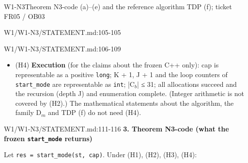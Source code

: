 \begin{card}{W1-N3}{Theorem N3-code (a)–(e) and the reference algorithm TDP (f); ticket FR05 / OB03}
\begin{stmt}{W1/W1-N3/STATEMENT.md:105-105}
\begin{itemize}
\end{itemize}
\end{stmt}
\begin{stmt}{W1/W1-N3/STATEMENT.md:106-109}
\begin{itemize}
\item (H4) \textbf{Execution} (for the claims about the frozen C++ only): cap is representable as a positive \texttt{long}; K + 1,
J + 1 and the loop counters of \texttt{start\_mode} are representable as \texttt{int}; |C$_{b}$| ≤ 31; all allocations succeed and the
recursion (depth J) and enumeration complete. (Integer arithmetic is not covered by (H2).) The mathematical
statements about the algorithm, the family D$_{m}$ and TDP (f) do not need (H4).
\end{itemize}
\end{stmt}
\begin{stmt}{W1/W1-N3/STATEMENT.md:111-116}
\textbf{3. Theorem N3-code (what the frozen \texttt{start\_mode} returns)}

Let \texttt{res = start\_mode(st, cap)}. Under (H1), (H2), (H3), (H4):


\end{stmt}
\end{card}
